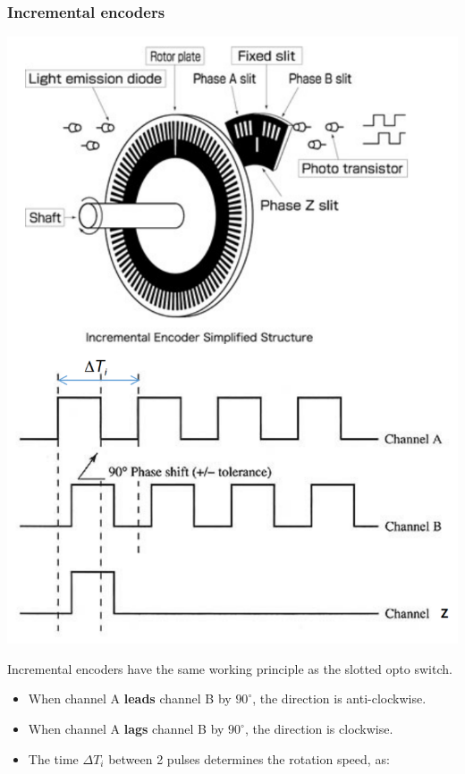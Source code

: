 \documentclass[11pt]{article}
\begin{document}
\subsubsection{Incremental encoders}
\label{sec:org71c9b37}
\begin{center}
\includegraphics[scale=0.7]{./images/incremental-encoder.png}
\end{center}
Incremental encoders have the same working principle as the slotted opto switch.
\begin{itemize}
\item When channel A \textbf{leads} channel B by \(90^{\circ}\), the direction is anti-clockwise.
\item When channel A \textbf{lags} channel B by \(90^{\circ}\), the direction is clockwise.
\item The time \(\Delta T_i\) between 2 pulses determines the rotation speed, as:
\end{itemize}
\end{document}

